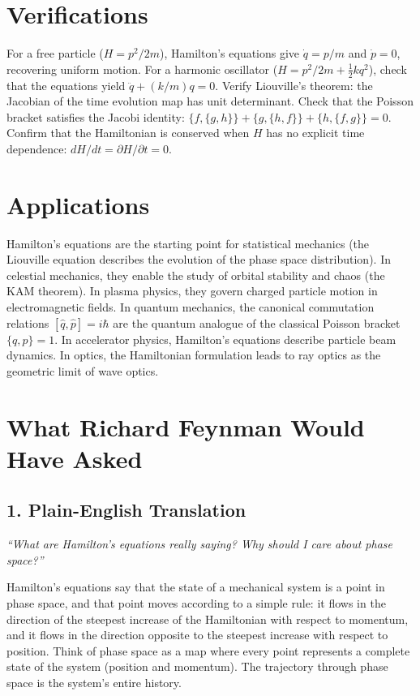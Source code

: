 \section*{Verifications}

For a free particle ($H = p^2/2m$), Hamilton's equations give $\dot{q} = p/m$ and $\dot{p} = 0$, recovering uniform motion. For a harmonic oscillator ($H = p^2/2m + \frac{1}{2}kq^2$), check that the equations yield $\ddot{q} + (k/m)q = 0$. Verify Liouville's theorem: the Jacobian of the time evolution map has unit determinant. Check that the Poisson bracket satisfies the Jacobi identity: $\{f, \{g, h\}\} + \{g, \{h, f\}\} + \{h, \{f, g\}\} = 0$. Confirm that the Hamiltonian is conserved when $H$ has no explicit time dependence: $dH/dt = \partial H/\partial t = 0$.
\section*{Applications}

Hamilton's equations are the starting point for statistical mechanics (the Liouville equation describes the evolution of the phase space distribution). In celestial mechanics, they enable the study of orbital stability and chaos (the KAM theorem). In plasma physics, they govern charged particle motion in electromagnetic fields. In quantum mechanics, the canonical commutation relations $[\hat{q}, \hat{p}] = i\hbar$ are the quantum analogue of the classical Poisson bracket $\{q, p\} = 1$. In accelerator physics, Hamilton's equations describe particle beam dynamics. In optics, the Hamiltonian formulation leads to ray optics as the geometric limit of wave optics.
\section*{What Richard Feynman Would Have Asked}

\subsection*{1. Plain-English Translation}
\textit{``What are Hamilton's equations really saying? Why should I care about phase space?''}

Hamilton's equations say that the state of a mechanical system is a point in phase space, and that point moves according to a simple rule: it flows in the direction of the steepest increase of the Hamiltonian with respect to momentum, and it flows in the direction opposite to the steepest increase with respect to position. Think of phase space as a map where every point represents a complete state of the system (position and momentum). The trajectory through phase space is the system's entire history.

